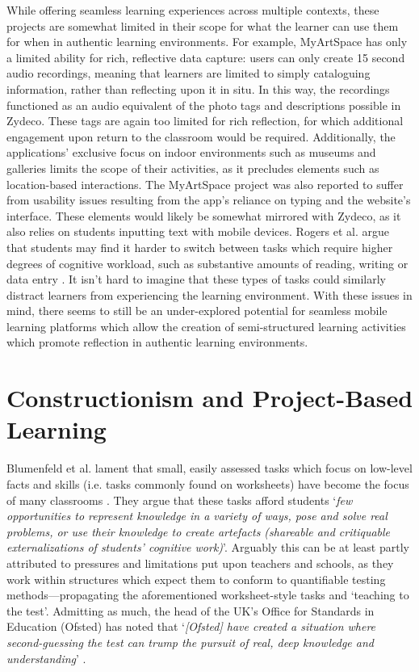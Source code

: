 While offering seamless learning experiences across multiple contexts, these projects are somewhat limited in their scope for what the learner can use them for when in authentic learning environments. For example, MyArtSpace has only a limited ability for rich, reflective data capture: users can only create 15 second audio recordings, meaning that learners are limited to simply cataloguing information, rather than reflecting upon it in situ. In this way, the recordings functioned as an audio equivalent of the photo tags and descriptions possible in Zydeco. These tags are again too limited for rich reflection, for which additional engagement upon return to the classroom would be required. Additionally, the applications' exclusive focus on indoor environments such as museums and galleries limits the scope of their activities, as it precludes elements such as location-based interactions. The MyArtSpace project was also reported to suffer from usability issues resulting from the app’s reliance on typing and the website’s interface. These elements would likely be somewhat mirrored with Zydeco, as it also relies on students inputting text with mobile devices. Rogers et al. argue that students may find it harder to switch between tasks which require higher degrees of cognitive workload, such as substantive amounts of reading, writing or data entry \citep{rogers2010}. It isn't hard to imagine that these types of tasks could similarly distract learners from experiencing the learning environment. With these issues in mind, there seems to still be an under-explored potential for seamless mobile learning platforms which allow the creation of semi-structured learning activities which promote reflection in authentic learning environments.

\section{Constructionism and Project-Based Learning}
\label{sec:ConstructionismPBL}

Blumenfeld et al. lament that small, easily assessed tasks which focus on low-level facts and skills (i.e. tasks commonly found on worksheets) have become the focus of many classrooms \citep{Blumenfeld1991}. They argue that these tasks afford students `\textit{few opportunities to represent knowledge in a variety of ways, pose and solve real problems, or use their knowledge to create artefacts (shareable and critiquable externalizations of students’ cognitive work)}'. Arguably this can be at least partly attributed to pressures and limitations put upon teachers and schools, as they work within structures which expect them to conform to quantifiable testing methods---propagating the aforementioned worksheet-style tasks and `teaching to the test'. Admitting as much, the head of the UK's Office for Standards in Education (Ofsted) has noted that `\textit{[Ofsted] have created a situation where second-guessing the test can trump the pursuit of real, deep knowledge and understanding}' \citep{Ofsted2018}. 

